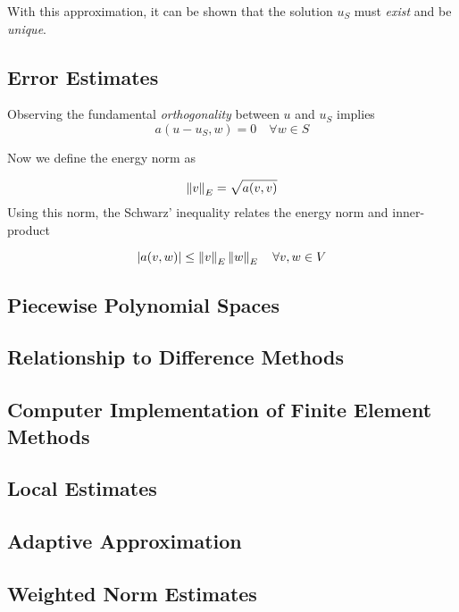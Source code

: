 \documentclass[../FEM.tex]{subfiles}
\begin{document}
With this approximation, it can be shown that the solution \(u_S\) must
\emph{exist} and be \emph{unique}.

\subsection{Error Estimates}
\label{error-estimates}

Observing the fundamental \emph{orthogonality} between \(u\) and \(u_S\)
implies \[
a(u-u_S,w)=0\quad \forall w\in S
\]

Now we define the energy norm as

\[
\left\lVert v\right\rVert_E=\sqrt{a(v,v)}
\] Using this norm, the Schwarz' inequality relates the energy norm and
inner-product

\[
\left\lvert a(v,w)\right\rvert\leq \left\lVert v\right\rVert_E\left\lVert w\right\rVert_E\quad \forall v,w \in V
\]

\subsection{Piecewise Polynomial Spaces}
\label{sub:piecewise-polynomial-spaces}

\subsection{Relationship to Difference Methods}
\label{sub:relationship-to-difference-methods}

\subsection{Computer Implementation of Finite Element Methods}
\label{sub:computer-implementation-of-finite-element-methods}

\subsection{Local Estimates}
\label{sub:local-estimates}

\subsection{Adaptive Approximation}
\label{sub:adaptive-approximation}

\subsection{Weighted Norm Estimates}
\label{sub:weighted-norm-estimates}
\end{document}
